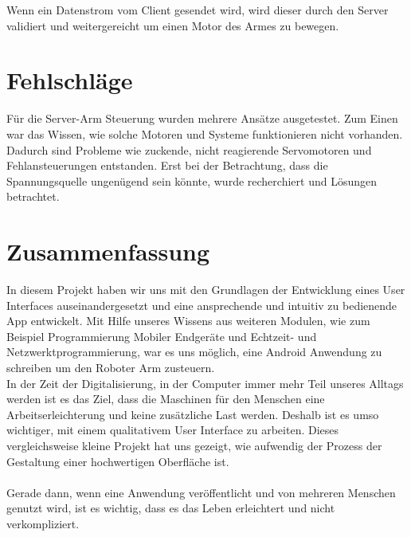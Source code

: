 \documentclass[12pt,					%
							 oneside,			%
							 a4paper,			%
							 halfparskip,		%
							 liststotoc,			%
							 bibtotoc,			%
							 fleqn,				%
							 pointlessnumbers]	%
							 {scrreprt}
\begin{document}
Wenn ein Datenstrom vom Client gesendet wird, wird dieser durch den Server validiert und weitergereicht um einen Motor des Armes zu bewegen.


\chapter{Fehlschläge}
Für die Server-Arm Steuerung wurden mehrere Ansätze ausgetestet. Zum Einen war das Wissen, wie solche Motoren und Systeme funktionieren nicht vorhanden. Dadurch sind Probleme wie zuckende, nicht reagierende Servomotoren und Fehlansteuerungen entstanden. Erst bei der Betrachtung, dass die Spannungsquelle ungenügend sein könnte, wurde recherchiert\cite{I2C} und Lösungen betrachtet. 

 
\chapter{Zusammenfassung}	
In diesem Projekt haben wir uns mit den Grundlagen der Entwicklung eines User Interfaces auseinandergesetzt und eine ansprechende und intuitiv zu bedienende App entwickelt. Mit Hilfe unseres Wissens aus weiteren Modulen, wie zum Beispiel \glqq{}Programmierung Mobiler Endgeräte\grqq{} und \glqq{}Echtzeit- und Netzwerktprogrammierung\grqq{}, war es uns möglich, eine Android Anwendung zu schreiben um den Roboter Arm zusteuern. 
\\
In der Zeit der Digitalisierung, in der Computer immer mehr Teil unseres Alltags werden ist es das Ziel, dass die Maschinen für den Menschen eine Arbeitserleichterung und keine zusätzliche Last werden. Deshalb ist es umso wichtiger, mit einem qualitativem User Interface zu arbeiten. Dieses vergleichsweise kleine Projekt hat uns gezeigt, wie aufwendig der Prozess der Gestaltung einer hochwertigen Oberfläche ist.\\ \\
Gerade dann, wenn eine Anwendung veröffentlicht und von mehreren Menschen genutzt wird, ist es wichtig, dass es das Leben erleichtert und nicht verkompliziert.
\end{document}
